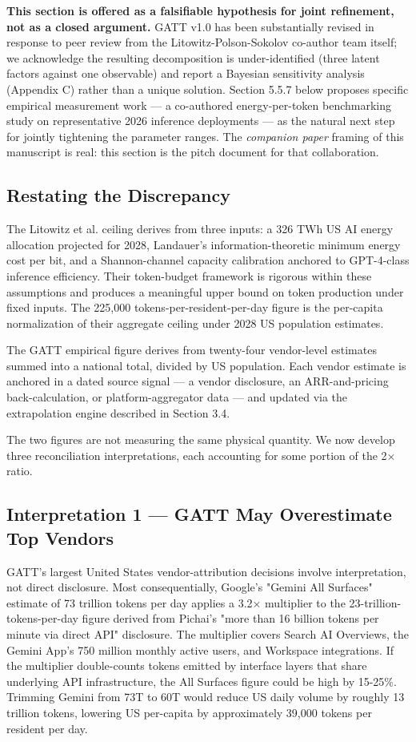\documentclass[11pt,a4paper]{article}
\begin{document}
\textbf{This section is offered as a falsifiable hypothesis for joint refinement, not as a closed argument.} GATT v1.0 has been substantially revised in response to peer review from the Litowitz-Polson-Sokolov co-author team itself; we acknowledge the resulting decomposition is under-identified (three latent factors against one observable) and report a Bayesian sensitivity analysis (Appendix C) rather than a unique solution. Section 5.5.7 below proposes specific empirical measurement work --- a co-authored energy-per-token benchmarking study on representative 2026 inference deployments --- as the natural next step for jointly tightening the parameter ranges. The \emph{companion paper} framing of this manuscript is real: this section is the pitch document for that collaboration.

\subsection{Restating the Discrepancy}

The Litowitz et al. ceiling derives from three inputs: a 326 TWh US AI energy allocation projected for 2028, Landauer's information-theoretic minimum energy cost per bit, and a Shannon-channel capacity calibration anchored to GPT-4-class inference efficiency. Their token-budget framework is rigorous within these assumptions and produces a meaningful upper bound on token production under fixed inputs. The 225,000 tokens-per-resident-per-day figure is the per-capita normalization of their aggregate ceiling under 2028 US population estimates.

The GATT empirical figure derives from twenty-four vendor-level estimates summed into a national total, divided by US population. Each vendor estimate is anchored in a dated source signal --- a vendor disclosure, an ARR-and-pricing back-calculation, or platform-aggregator data --- and updated via the extrapolation engine described in Section 3.4.

The two figures are not measuring the same physical quantity. We now develop three reconciliation interpretations, each accounting for some portion of the 2× ratio.

\subsection{Interpretation 1 --- GATT May Overestimate Top Vendors}

GATT's largest United States vendor-attribution decisions involve interpretation, not direct disclosure. Most consequentially, Google's "Gemini All Surfaces" estimate of 73 trillion tokens per day applies a 3.2× multiplier to the 23-trillion-tokens-per-day figure derived from Pichai's "more than 16 billion tokens per minute via direct API" disclosure. The multiplier covers Search AI Overviews, the Gemini App's 750 million monthly active users, and Workspace integrations. If the multiplier double-counts tokens emitted by interface layers that share underlying API infrastructure, the All Surfaces figure could be high by 15-25\%. Trimming Gemini from 73T to 60T would reduce US daily volume by roughly 13 trillion tokens, lowering US per-capita by approximately 39,000 tokens per resident per day.
\end{document}
